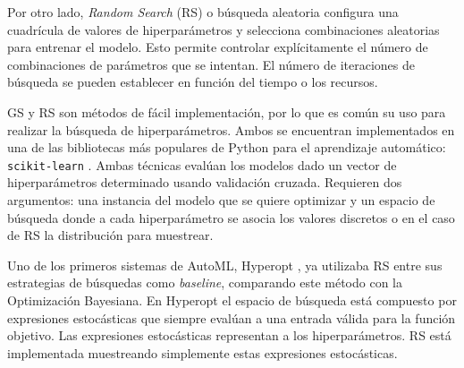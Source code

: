 Por otro lado, \textit{Random Search} (RS) o búsqueda aleatoria configura una cuadrícula de valores de hiperparámetros y selecciona combinaciones aleatorias para entrenar el modelo. Esto permite controlar explícitamente el número de combinaciones de parámetros que se intentan. El número de iteraciones de búsqueda se pueden establecer en función del tiempo o los recursos.


GS y RS son métodos de fácil implementación, por lo que es común su uso para realizar la búsqueda de hiperparámetros. Ambos se encuentran implementados en una de las bibliotecas más populares de Python para el aprendizaje automático: \texttt{scikit-learn} \cite{scikit-learn}. Ambas técnicas evalúan los modelos dado un vector de hiperparámetros determinado usando validación cruzada. Requieren dos argumentos: una instancia del modelo que se quiere optimizar y un espacio de búsqueda donde a cada hiperparámetro se asocia los valores discretos o en el caso de RS la distribución para muestrear.

Uno de los primeros sistemas de AutoML, Hyperopt \cite{bergstra2013hyperopt}, ya utilizaba RS entre sus estrategias de búsquedas como \textit{baseline}, comparando este método con la Optimización Bayesiana. En Hyperopt el espacio de búsqueda está compuesto por expresiones estocásticas que siempre evalúan a una entrada válida para la función objetivo. Las expresiones estocásticas representan a los hiperparámetros. RS está implementada muestreando simplemente estas expresiones estocásticas.

